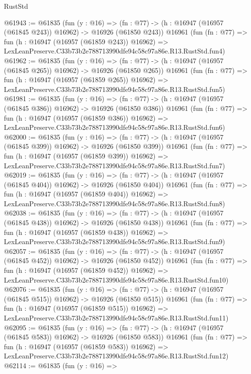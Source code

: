 \begin{lexlean}{RustStd}
\begin{coremodule}
@61943 := @61835
    (fun (y : @16) =>
    (fn : @77) -> (h : @16947 (@16957 (@61845 @243)) @16962) -> @16926 (@61850 @243))
    @16961
    (fun (fn : @77) =>
    fun (h : @16947 (@16957 (@61859 @243)) @16962) =>
    LexLeanPreserve.C33b73b2e788713990dfe94c58c97a86e.R13.RustStd.fun4)
@61962 := @61835
    (fun (y : @16) =>
    (fn : @77) -> (h : @16947 (@16957 (@61845 @265)) @16962) -> @16926 (@61850 @265))
    @16961
    (fun (fn : @77) =>
    fun (h : @16947 (@16957 (@61859 @265)) @16962) =>
    LexLeanPreserve.C33b73b2e788713990dfe94c58c97a86e.R13.RustStd.fun5)
@61981 := @61835
    (fun (y : @16) =>
    (fn : @77) -> (h : @16947 (@16957 (@61845 @386)) @16962) -> @16926 (@61850 @386))
    @16961
    (fun (fn : @77) =>
    fun (h : @16947 (@16957 (@61859 @386)) @16962) =>
    LexLeanPreserve.C33b73b2e788713990dfe94c58c97a86e.R13.RustStd.fun6)
@62000 := @61835
    (fun (y : @16) =>
    (fn : @77) -> (h : @16947 (@16957 (@61845 @399)) @16962) -> @16926 (@61850 @399))
    @16961
    (fun (fn : @77) =>
    fun (h : @16947 (@16957 (@61859 @399)) @16962) =>
    LexLeanPreserve.C33b73b2e788713990dfe94c58c97a86e.R13.RustStd.fun7)
@62019 := @61835
    (fun (y : @16) =>
    (fn : @77) -> (h : @16947 (@16957 (@61845 @404)) @16962) -> @16926 (@61850 @404))
    @16961
    (fun (fn : @77) =>
    fun (h : @16947 (@16957 (@61859 @404)) @16962) =>
    LexLeanPreserve.C33b73b2e788713990dfe94c58c97a86e.R13.RustStd.fun8)
@62038 := @61835
    (fun (y : @16) =>
    (fn : @77) -> (h : @16947 (@16957 (@61845 @438)) @16962) -> @16926 (@61850 @438))
    @16961
    (fun (fn : @77) =>
    fun (h : @16947 (@16957 (@61859 @438)) @16962) =>
    LexLeanPreserve.C33b73b2e788713990dfe94c58c97a86e.R13.RustStd.fun9)
@62057 := @61835
    (fun (y : @16) =>
    (fn : @77) -> (h : @16947 (@16957 (@61845 @452)) @16962) -> @16926 (@61850 @452))
    @16961
    (fun (fn : @77) =>
    fun (h : @16947 (@16957 (@61859 @452)) @16962) =>
    LexLeanPreserve.C33b73b2e788713990dfe94c58c97a86e.R13.RustStd.fun10)
@62076 := @61835
    (fun (y : @16) =>
    (fn : @77) -> (h : @16947 (@16957 (@61845 @515)) @16962) -> @16926 (@61850 @515))
    @16961
    (fun (fn : @77) =>
    fun (h : @16947 (@16957 (@61859 @515)) @16962) =>
    LexLeanPreserve.C33b73b2e788713990dfe94c58c97a86e.R13.RustStd.fun11)
@62095 := @61835
    (fun (y : @16) =>
    (fn : @77) -> (h : @16947 (@16957 (@61845 @583)) @16962) -> @16926 (@61850 @583))
    @16961
    (fun (fn : @77) =>
    fun (h : @16947 (@16957 (@61859 @583)) @16962) =>
    LexLeanPreserve.C33b73b2e788713990dfe94c58c97a86e.R13.RustStd.fun12)
@62114 := @61835
    (fun (y : @16) =>

\end{coremodule}
\end{lexlean}
